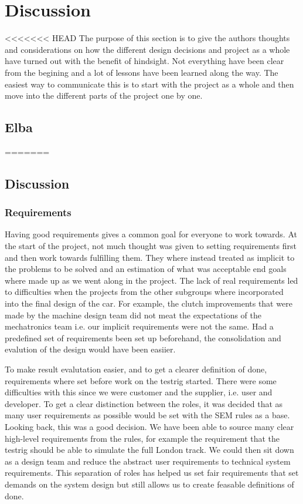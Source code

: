 \chapter{Discussion}
<<<<<<< HEAD
The purpose of this section is to give the authors thoughts and considerations
on how the different design decisions and project as a whole have turned out
with the benefit of hindsight. Not everything have been clear from the begining
and a lot of lessons have been learned along the way. The easiest way to
communicate this is to start with the project as a whole and then move into the
different parts of the project one by one. 
\section{Elba}

=======
\section{Discussion}

\subsection{Requirements}
Having good requirements gives a common goal for everyone to work towards. At
the start of the project, not much thought was given to setting requirements
first and then work towards fulfilling them. They where instead treated as
implicit to the problems to be solved and an estimation of what was acceptable
end goals where made up as we went along in the project. The lack of real
requirements led to difficulties when the projects from the other subgroups
where incorporated into the final design of the car. For example, the clutch
improvements that were made by the machine design team did not meat the
expectations of the mechatronics team i.e. our implicit requirements were not
the same. Had a predefined set of requirements been set up beforehand, the
consolidation and evalution of the design would have been easiier.

To make result evalutation easier, and to get a clearer definition of done,
requirements where set before work on the testrig started. There were some
difficulties with this since we were customer and the supplier, i.e. user and
developer. To get a clear distinction between the roles, it was decided that as
many user requirements as possible would be set with the SEM rules as a base.
Looking back, this was a good decision. We have been able to source many clear
high-level requirements from the rules, for example the requirement that the
testrig should be able to simulate the full London track. We could then sit down
as a design team and reduce the abstract user requirements to technical system
requirements. This separation of roles has helped us set fair requirements that
set demands on the system design but still allows us to create feasable
definitions of done. 

